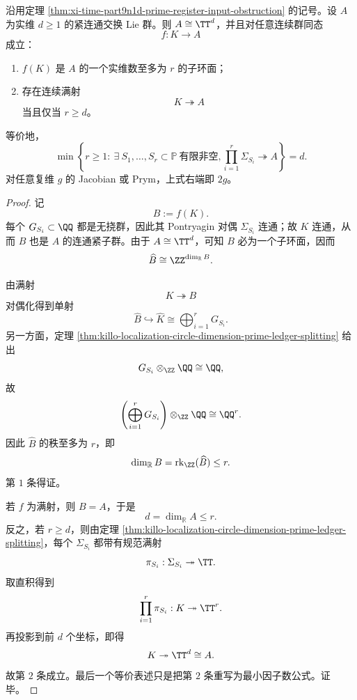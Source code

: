 \begin{theorem}\label{thm:xi-time-part9n1d-prime-register-output-rank-threshold}
沿用定理 \ref{thm:xi-time-part9n1d-prime-register-input-obstruction} 的记号。设 \(A\) 为实维 \(d\ge 1\) 的紧连通交换 Lie 群。则 \(A\cong \TT^d\)，并且对任意连续群同态
\[
f:K\longrightarrow A
\]
成立：
\begin{enumerate}
  \item \(f(K)\) 是 \(A\) 的一个实维数至多为 \(r\) 的子环面；
  \item 存在连续满射
  \[
  K\twoheadrightarrow A
  \]
  当且仅当 \(r\ge d\)。
\end{enumerate}
等价地，
\[
\boxed{\;
\min\left\{
r\ge 1:\ \exists\ S_1,\dots,S_r\subset \mathbb P\ \text{有限非空},
\prod_{i=1}^r \Sigma_{S_i}\twoheadrightarrow A
\right\}
=d.\;}
\]
对任意复维 \(g\) 的 Jacobian 或 Prym，上式右端即 \(2g\)。
\end{theorem}
\begin{proof}
记
\[
B:=f(K).
\]
每个 \(G_{S_i}\subset \QQ\) 都是无挠群，因此其 Pontryagin 对偶 \(\Sigma_{S_i}\) 连通；故 \(K\) 连通，从而 \(B\) 也是 \(A\) 的连通紧子群。由于 \(A\cong \TT^d\)，可知 \(B\) 必为一个子环面，因而
\[
\widehat B\cong \ZZ^{\dim_{\mathbb R}B}.
\]

由满射
\[
K\twoheadrightarrow B
\]
对偶化得到单射
\[
\widehat B\hookrightarrow \widehat K\cong \bigoplus_{i=1}^r G_{S_i}.
\]
另一方面，定理 \ref{thm:killo-localization-circle-dimension-prime-ledger-splitting} 给出
\[
G_{S_i}\otimes_{\ZZ}\QQ\cong \QQ,
\]
故
\[
\left(\bigoplus_{i=1}^r G_{S_i}\right)\otimes_{\ZZ}\QQ\cong \QQ^r.
\]
因此 \(\widehat B\) 的秩至多为 \(r\)，即
\[
\dim_{\mathbb R}B=\operatorname{rk}_{\ZZ}(\widehat B)\le r.
\]
第 \(1\) 条得证。

若 \(f\) 为满射，则 \(B=A\)，于是
\[
d=\dim_{\mathbb R}A\le r.
\]
反之，若 \(r\ge d\)，则由定理 \ref{thm:killo-localization-circle-dimension-prime-ledger-splitting}，每个 \(\Sigma_{S_i}\) 都带有规范满射
\[
\pi_{S_i}:\Sigma_{S_i}\twoheadrightarrow \TT.
\]
取直积得到
\[
\prod_{i=1}^r\pi_{S_i}:K\twoheadrightarrow \TT^r.
\]
再投影到前 \(d\) 个坐标，即得
\[
K\twoheadrightarrow \TT^d\cong A.
\]
故第 \(2\) 条成立。最后一个等价表述只是把第 \(2\) 条重写为最小因子数公式。证毕。
\end{proof}

